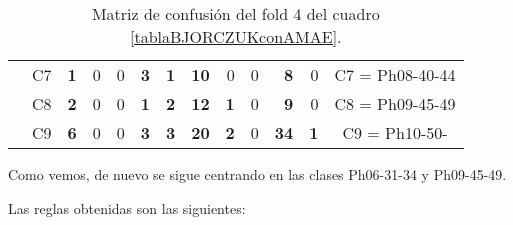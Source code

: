 \begin{table}[H]
{\begin{tabular}{|ccrrrrrrrrrrc|}
\multicolumn{1}{|c|}{}                                      & \multicolumn{1}{c|}{C7} & \multicolumn{1}{r|}{\textbf{1}} & \multicolumn{1}{r|}{0}          & \multicolumn{1}{r|}{0}          & \multicolumn{1}{r|}{\textbf{3}} & \multicolumn{1}{r|}{\textbf{1}} & \multicolumn{1}{r|}{\textbf{10}} & \multicolumn{1}{r|}{0}          & \multicolumn{1}{r|}{0}  & \multicolumn{1}{r|}{\textbf{8}}  & \multicolumn{1}{r|}{0}          & C7 = Ph08-40-44   \\ \cline{2-13}
\multicolumn{1}{|c|}{}                                      & \multicolumn{1}{c|}{C8} & \multicolumn{1}{r|}{\textbf{2}} & \multicolumn{1}{r|}{0}          & \multicolumn{1}{r|}{0}          & \multicolumn{1}{r|}{\textbf{1}} & \multicolumn{1}{r|}{\textbf{2}} & \multicolumn{1}{r|}{\textbf{12}} & \multicolumn{1}{r|}{\textbf{1}} & \multicolumn{1}{r|}{0}  & \multicolumn{1}{r|}{\textbf{9}}  & \multicolumn{1}{r|}{0}          & C8 = Ph09-45-49   \\ \cline{2-13}
\multicolumn{1}{|c|}{}                                      & \multicolumn{1}{c|}{C9} & \multicolumn{1}{r|}{\textbf{6}} & \multicolumn{1}{r|}{0}          & \multicolumn{1}{r|}{0}          & \multicolumn{1}{r|}{\textbf{3}} & \multicolumn{1}{r|}{\textbf{3}} & \multicolumn{1}{r|}{\textbf{20}} & \multicolumn{1}{r|}{\textbf{2}} & \multicolumn{1}{r|}{0}  & \multicolumn{1}{r|}{\textbf{34}} & \multicolumn{1}{r|}{\textbf{1}} & C9 = Ph10-50-     \\ \hline
\end{tabular}%
}
\caption{Matriz de confusión del fold 4 del cuadro \ref{tablaBJORCZUKconAMAE}.}
\end{table}


Como vemos, de nuevo se sigue centrando en las clases Ph06-31-34 y Ph09-45-49.

\newpage

Las reglas obtenidas son las siguientes:

